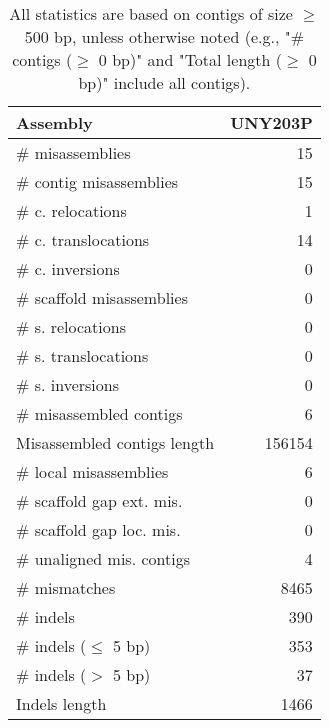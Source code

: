 \documentclass[12pt,a4paper]{article}
\begin{document}
\begin{table}[ht]
\begin{center}
\caption{All statistics are based on contigs of size $\geq$ 500 bp, unless otherwise noted (e.g., "\# contigs ($\geq$ 0 bp)" and "Total length ($\geq$ 0 bp)" include all contigs).}
\begin{tabular}{|l*{1}{|r}|}
\hline
Assembly & UNY203P \\ \hline
\# misassemblies & 15 \\ \hline
\hspace{2mm}\# contig misassemblies & 15 \\ \hline
\hspace{5mm}\# c. relocations & 1 \\ \hline
\hspace{5mm}\# c. translocations & 14 \\ \hline
\hspace{5mm}\# c. inversions & 0 \\ \hline
\hspace{2mm}\# scaffold misassemblies & 0 \\ \hline
\hspace{5mm}\# s. relocations & 0 \\ \hline
\hspace{5mm}\# s. translocations & 0 \\ \hline
\hspace{5mm}\# s. inversions & 0 \\ \hline
\# misassembled contigs & 6 \\ \hline
Misassembled contigs length & 156154 \\ \hline
\# local misassemblies & 6 \\ \hline
\# scaffold gap ext. mis. & 0 \\ \hline
\# scaffold gap loc. mis. & 0 \\ \hline
\# unaligned mis. contigs & 4 \\ \hline
\# mismatches & 8465 \\ \hline
\# indels & 390 \\ \hline
\hspace{5mm}\# indels ($\leq$ 5 bp) & 353 \\ \hline
\hspace{5mm}\# indels ($>$ 5 bp) & 37 \\ \hline
Indels length & 1466 \\ \hline
\end{tabular}
\end{center}
\end{table}
\end{document}
